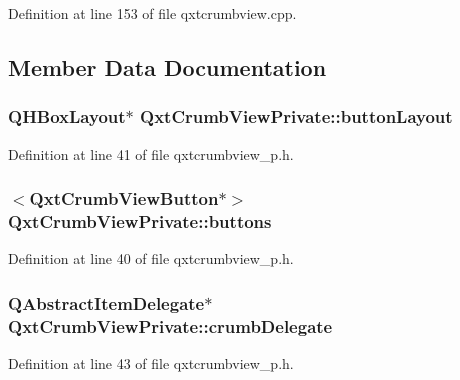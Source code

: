 Definition at line 153 of file qxtcrumbview.\-cpp.



\subsection{Member Data Documentation}
\hypertarget{class_qxt_crumb_view_private_a482aef6ef4ce71143140d7dd92284e85}{
\subsubsection[{button\-Layout}]{\setlength{\rightskip}{0pt plus 5cm}Q\-H\-Box\-Layout$\ast$ Qxt\-Crumb\-View\-Private\-::button\-Layout}}\label{class_qxt_crumb_view_private_a482aef6ef4ce71143140d7dd92284e85}


Definition at line 41 of file qxtcrumbview\-\_\-p.\-h.

\hypertarget{class_qxt_crumb_view_private_a99a3d0ca4d38a3e8100c5564daa972c6}{
\subsubsection[{buttons}]{$<${\bf Qxt\-Crumb\-View\-Button}$\ast$$>$ Qxt\-Crumb\-View\-Private\-::buttons}}\label{class_qxt_crumb_view_private_a99a3d0ca4d38a3e8100c5564daa972c6}


Definition at line 40 of file qxtcrumbview\-\_\-p.\-h.

\hypertarget{class_qxt_crumb_view_private_aa2979d19252f37122f21717a195a20fa}{
\subsubsection[{crumb\-Delegate}]{\setlength{\rightskip}{0pt plus 5cm}Q\-Abstract\-Item\-Delegate$\ast$ Qxt\-Crumb\-View\-Private\-::crumb\-Delegate}}\label{class_qxt_crumb_view_private_aa2979d19252f37122f21717a195a20fa}


Definition at line 43 of file qxtcrumbview\-\_\-p.\-h.

